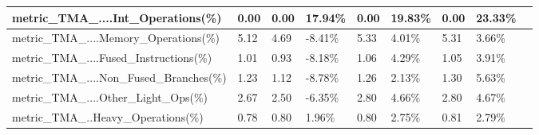 \documentclass[12pt]{article}
\begin{document}
\begin{longtable}{|m{139.55pt}|m{40.35pt}|m{36.25pt}|m{36.25pt}|m{36.25pt}|m{42.10pt}|m{30.30pt}|m{44.65pt}|@{}m{0pt}@{}}
\raggedright\arraybackslash{}metric\_\allowbreak{}TMA\_\allowbreak{}....Int\_\allowbreak{}Operations(\%) & \centering\arraybackslash{}0.00 & \centering\arraybackslash{}0.00 & \cellcolor[HTML]{D9D9D9}\centering\arraybackslash{}17.94\% & \centering\arraybackslash{}0.00 & \cellcolor[HTML]{D9D9D9}\centering\arraybackslash{}19.83\% & \centering\arraybackslash{}0.00 & \cellcolor[HTML]{D9D9D9}\centering\arraybackslash{}23.33\% & \rule[-0.00pt]{0pt}{14.40pt} \\ \hline
\raggedright\arraybackslash{}metric\_\allowbreak{}TMA\_\allowbreak{}....Memory\_\allowbreak{}Operations(\%) & \centering\arraybackslash{}5.12 & \centering\arraybackslash{}4.69 & \cellcolor[HTML]{D9D9D9}\centering\arraybackslash{}-8.41\% & \centering\arraybackslash{}5.33 & \cellcolor[HTML]{D9D9D9}\centering\arraybackslash{}4.01\% & \centering\arraybackslash{}5.31 & \cellcolor[HTML]{D9D9D9}\centering\arraybackslash{}3.66\% & \rule[-0.00pt]{0pt}{14.40pt} \\ \hline
\raggedright\arraybackslash{}metric\_\allowbreak{}TMA\_\allowbreak{}....Fused\_\allowbreak{}Instructions(\%) & \centering\arraybackslash{}1.01 & \centering\arraybackslash{}0.93 & \cellcolor[HTML]{D9D9D9}\centering\arraybackslash{}-8.18\% & \centering\arraybackslash{}1.06 & \cellcolor[HTML]{D9D9D9}\centering\arraybackslash{}4.29\% & \centering\arraybackslash{}1.05 & \cellcolor[HTML]{D9D9D9}\centering\arraybackslash{}3.91\% & \rule[-0.00pt]{0pt}{14.40pt} \\ \hline
\raggedright\arraybackslash{}metric\_\allowbreak{}TMA\_\allowbreak{}....Non\_\allowbreak{}Fused\_\allowbreak{}Branches(\%) & \centering\arraybackslash{}1.23 & \centering\arraybackslash{}1.12 & \cellcolor[HTML]{D9D9D9}\centering\arraybackslash{}-8.78\% & \centering\arraybackslash{}1.26 & \cellcolor[HTML]{D9D9D9}\centering\arraybackslash{}2.13\% & \centering\arraybackslash{}1.30 & \cellcolor[HTML]{D9D9D9}\centering\arraybackslash{}5.63\% & \rule[-0.00pt]{0pt}{14.40pt} \\ \hline
\raggedright\arraybackslash{}metric\_\allowbreak{}TMA\_\allowbreak{}....Other\_\allowbreak{}Light\_\allowbreak{}Ops(\%) & \centering\arraybackslash{}2.67 & \centering\arraybackslash{}2.50 & \cellcolor[HTML]{D9D9D9}\centering\arraybackslash{}-6.35\% & \centering\arraybackslash{}2.80 & \cellcolor[HTML]{D9D9D9}\centering\arraybackslash{}4.66\% & \centering\arraybackslash{}2.80 & \cellcolor[HTML]{D9D9D9}\centering\arraybackslash{}4.67\% & \rule[-0.00pt]{0pt}{14.40pt} \\ \hline
\raggedright\arraybackslash{}metric\_\allowbreak{}TMA\_\allowbreak{}..Heavy\_\allowbreak{}Operations(\%) & \centering\arraybackslash{}0.78 & \centering\arraybackslash{}0.80 & \cellcolor[HTML]{D9D9D9}\centering\arraybackslash{}1.96\% & \centering\arraybackslash{}0.80 & \cellcolor[HTML]{D9D9D9}\centering\arraybackslash{}2.75\% & \centering\arraybackslash{}0.81 & \cellcolor[HTML]{D9D9D9}\centering\arraybackslash{}2.79\% & \rule[-0.00pt]{0pt}{14.40pt} \\ \hline

\end{longtable}
\end{document}
